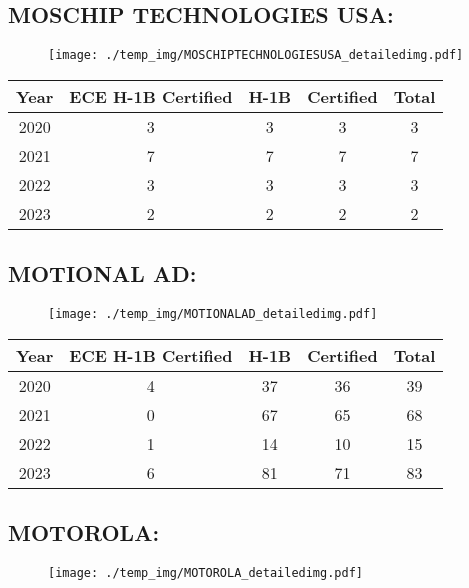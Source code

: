 \documentclass{article}%
\begin{document}
%
\newpage%
\subsection{MOSCHIP TECHNOLOGIES USA:}%
\label{subsec:MOSCHIPTECHNOLOGIESUSA}%
\label{MOSCHIPTECHNOLOGIESUSAdetailed}%


\begin{figure}[htbp]%
\centering%
\texttt{[image: ./temp\_img/MOSCHIPTECHNOLOGIESUSA\_detailedimg.pdf]}%
\end{figure}

%
\begin{longtable}{c|c|c|c|c}%
\hline%
Year&ECE H{-}1B Certified&H{-}1B&Certified&Total\\%
\hline%
2020&3&3&3&3\\%
\hline%
2021&7&7&7&7\\%
\hline%
2022&3&3&3&3\\%
\hline%
2023&2&2&2&2\\%
\hline%
\end{longtable}

%
\newpage%
\subsection{MOTIONAL AD:}%
\label{subsec:MOTIONALAD}%
\label{MOTIONALADdetailed}%


\begin{figure}[htbp]%
\centering%
\texttt{[image: ./temp\_img/MOTIONALAD\_detailedimg.pdf]}%
\end{figure}

%
\begin{longtable}{c|c|c|c|c}%
\hline%
Year&ECE H{-}1B Certified&H{-}1B&Certified&Total\\%
\hline%
2020&4&37&36&39\\%
\hline%
2021&0&67&65&68\\%
\hline%
2022&1&14&10&15\\%
\hline%
2023&6&81&71&83\\%
\hline%
\end{longtable}

%
\newpage%
\subsection{MOTOROLA:}%
\label{subsec:MOTOROLA}%
\label{MOTOROLAdetailed}%


\begin{figure}[htbp]%
\centering%
\texttt{[image: ./temp\_img/MOTOROLA\_detailedimg.pdf]}%
\end{figure}
\end{document}
